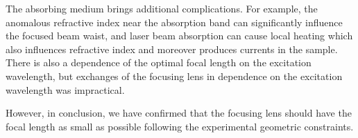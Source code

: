 The absorbing medium brings additional complications. For example, the
anomalous refractive index near the absorption band can significantly
influence the focused beam waist, and laser beam absorption can cause local
heating which also influences refractive index and moreover produces currents
in the sample. There is also a dependence of the optimal focal length on the
excitation wavelength, but exchanges of the focusing lens in dependence on
the excitation wavelength was impractical.

However, in conclusion, we have confirmed that
the focusing lens should have the focal length as
small as possible following the experimental geometric constraints.
